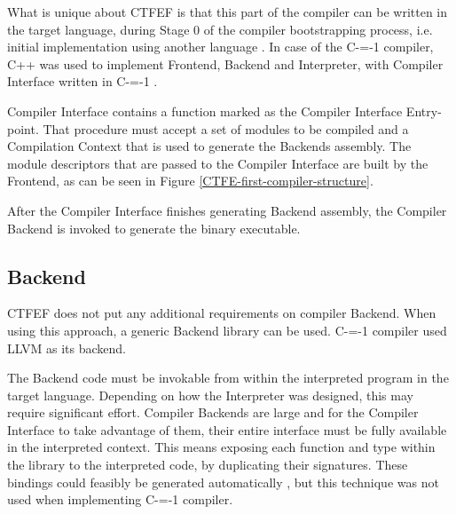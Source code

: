 What is unique about CTFEF is that this part of the compiler can be written in the target language, during Stage 0 of the compiler bootstrapping process, i.e. initial implementation using another language \cite{puntambekar:compiler_design, novillo2007gcc}.
In case of the C-=-1 compiler, C++ was used to implement Frontend, Backend and Interpreter, with Compiler Interface written in C-=-1 \cite{grabski2022compilation}.

Compiler Interface contains a function marked as the Compiler Interface Entry-point.
That procedure must accept a set of modules to be compiled and a Compilation Context that is used to generate the Backends assembly.
The module descriptors that are passed to the Compiler Interface are built by the Frontend, as can be seen in Figure \ref{CTFE-first-compiler-structure}.

After the Compiler Interface finishes generating Backend assembly, the Compiler Backend is invoked to generate the binary executable.
\subsection{Backend}
\label{Backend}

CTFEF does not put any additional requirements on compiler Backend.
When using this approach, a generic Backend library can be used.
C-=-1 compiler used LLVM\cite{lattner2008llvm} as its backend.

The Backend code must be invokable from within the interpreted program in the target language.
Depending on how the Interpreter was designed, this may require significant effort. %
Compiler Backends are large and for the Compiler Interface to take advantage of them, their entire interface must be fully available in the interpreted context.
This means exposing each function and type within the library to the interpreted code, by duplicating their signatures.
These bindings could feasibly be generated automatically \cite{marshalling_auto_generation}, but this technique was not used when implementing C-=-1 compiler.
